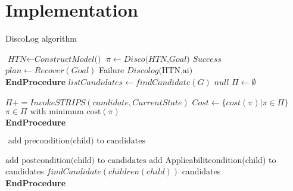 
\chapter{Implementation} %

\label{Chapter 5} %


\begin{algorithm}
	\caption{DiscoLog algorithm}\label{euclid}
	\begin{algorithmic}[]
		\State $\textit{HTN} \gets\textit{ConstructModel()} $
		\State $\pi \gets Disco \textit{(HTN,Goal)}$
		\State \Return $\textit{Success} $
		\Else 
		\State$ plan \gets Recover(Goal)$
		\State \Return Failure
		\Else 
		\State  $\textit{Discolog} \text{(HTN,ai)}$
		\EndFor
		\EndIf
		\EndIf
		\\
		\EndProcedure \textbf{EndProcedure}
		\State 
		\State $\textit{listCandidates}\gets\textit{findCandidate}{(G)} $
		\State \Return $\textit{null} $
		\Else 
		\State $\Pi \gets \emptyset$
		
		\State $\Pi += InvokeSTRIPS(candidate,CurrentState)$
		\State  $Cost \gets \{ cost(\pi) | \pi \in  \Pi \} $
		\EndFor
		\EndIf
		\State \Return $\pi \in \Pi \text{ with minimum cost}(\pi)$
		\\
		\EndProcedure \textbf{EndProcedure}
		
		\State 
		
		\State $  \text{ add precondition(child) to candidates}$
		
		\State $\text{add postcondition(child) to candidates}$
		\EndIf
		\State add Applicabilitcondition(child) to candidates
		\EndIf
		\State $\textit{findCandidate} (children(child))$
		\EndFor
		\State \Return candidates
		\\
		\EndProcedure \textbf{EndProcedure}
		
	\end{algorithmic}
\end{algorithm}
